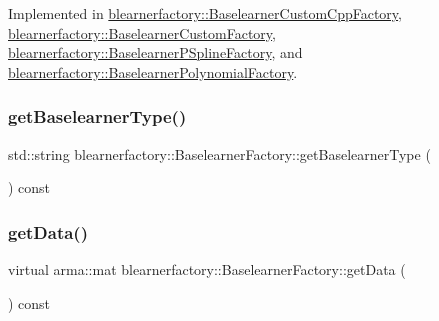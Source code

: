 Implemented in \mbox{\hyperlink{classblearnerfactory_1_1_baselearner_custom_cpp_factory_a1754f789953cc9d12f7cdd861772d13b}{blearnerfactory\+::\+Baselearner\+Custom\+Cpp\+Factory}}, \mbox{\hyperlink{classblearnerfactory_1_1_baselearner_custom_factory_a79a93fe73bd8f307bb888f76da39246d}{blearnerfactory\+::\+Baselearner\+Custom\+Factory}}, \mbox{\hyperlink{classblearnerfactory_1_1_baselearner_p_spline_factory_a3f47f46766e8e50eafe824bd97f7fc44}{blearnerfactory\+::\+Baselearner\+P\+Spline\+Factory}}, and \mbox{\hyperlink{classblearnerfactory_1_1_baselearner_polynomial_factory_a18095806fa93e6ac2159e966ededc1cf}{blearnerfactory\+::\+Baselearner\+Polynomial\+Factory}}.

\mbox{\label{classblearnerfactory_1_1_baselearner_factory_a05d5c00f7a434548868c4ad21d0f5fda}} 
\subsubsection{\texorpdfstring{get\+Baselearner\+Type()}{getBaselearnerType()}}
{\footnotesize\ttfamily std\+::string blearnerfactory\+::\+Baselearner\+Factory\+::get\+Baselearner\+Type (\begin{DoxyParamCaption}{ }\end{DoxyParamCaption}) const}

\mbox{\label{classblearnerfactory_1_1_baselearner_factory_aa3e4580bca870ca3b742dda6c820e1e6}} 
\subsubsection{\texorpdfstring{get\+Data()}{getData()}}
{\footnotesize\ttfamily virtual arma\+::mat blearnerfactory\+::\+Baselearner\+Factory\+::get\+Data (\begin{DoxyParamCaption}{ }\end{DoxyParamCaption}) const\hspace{0.3cm}{\ttfamily [pure virtual]}}




